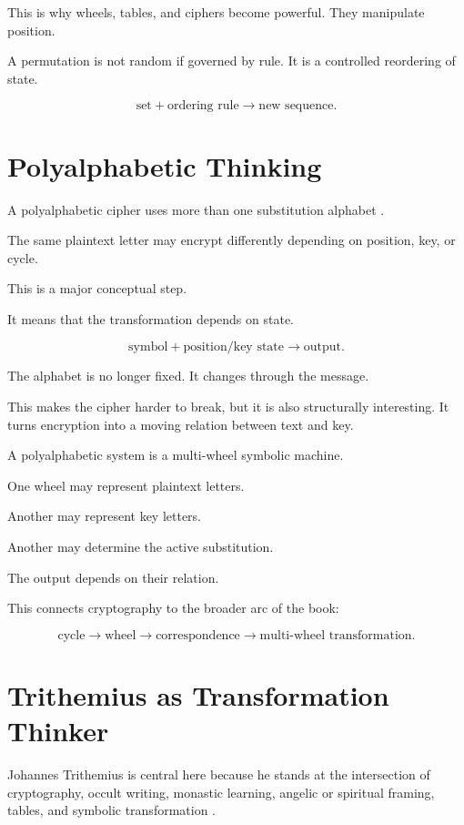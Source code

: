 \documentclass[11pt]{book}
\begin{document}
This is why wheels, tables, and ciphers become powerful. They manipulate position.

A permutation is not random if governed by rule. It is a controlled reordering of state.

\[
\text{set} + \text{ordering rule} \rightarrow \text{new sequence}.
\]

\section{Polyalphabetic Thinking}

A polyalphabetic cipher uses more than one substitution alphabet \cite{Kahn1996Codebreakers,Singh1999CodeBook,Trithemius1999Steganographia}.

The same plaintext letter may encrypt differently depending on position, key, or cycle.

This is a major conceptual step.

It means that the transformation depends on state.

\[
\text{symbol} + \text{position/key state} \rightarrow \text{output}.
\]

The alphabet is no longer fixed. It changes through the message.

This makes the cipher harder to break, but it is also structurally interesting. It turns encryption into a moving relation between text and key.

A polyalphabetic system is a multi-wheel symbolic machine.

One wheel may represent plaintext letters.

Another may represent key letters.

Another may determine the active substitution.

The output depends on their relation.

This connects cryptography to the broader arc of the book:

\[
\text{cycle}
\rightarrow
\text{wheel}
\rightarrow
\text{correspondence}
\rightarrow
\text{multi-wheel transformation}.
\]

\section{Trithemius as Transformation Thinker}

Johannes Trithemius is central here because he stands at the intersection of cryptography, occult writing, monastic learning, angelic or spiritual framing, tables, and symbolic transformation \cite{Trithemius1999Steganographia,Kahn1996Codebreakers,Yates1964GiordanoBruno}.
\end{document}

